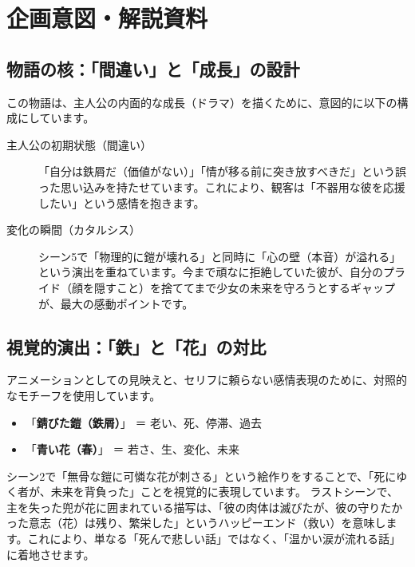 \clearpage\section{企画意図・解説資料}
\subsection{物語の核：「間違い」と「成長」の設計}
この物語は、主人公の内面的な成長（ドラマ）を描くために、意図的に以下の構成にしています。
\begin{description}
    \item [主人公の初期状態（間違い）] 「自分は鉄屑だ（価値がない）」「情が移る前に突き放すべきだ」という誤った思い込みを持たせています。これにより、観客は「不器用な彼を応援したい」という感情を抱きます。
    \item [変化の瞬間（カタルシス）] シーン5で「物理的に鎧が壊れる」と同時に「心の壁（本音）が溢れる」という演出を重ねています。今まで頑なに拒絶していた彼が、自分のプライド（顔を隠すこと）を捨ててまで少女の未来を守ろうとするギャップが、最大の感動ポイントです。
\end{description}

\subsection{視覚的演出：「鉄」と「花」の対比}
アニメーションとしての見映えと、セリフに頼らない感情表現のために、対照的なモチーフを使用しています。
\begin{itemize}
    \item 「\textbf{錆びた鎧（鉄屑）}」 ＝ 老い、死、停滞、過去
    \item 「\textbf{青い花（春）}」 ＝ 若さ、生、変化、未来
\end{itemize}
シーン2で「無骨な鎧に可憐な花が刺さる」という絵作りをすることで、「死にゆく者が、未来を背負った」ことを視覚的に表現しています。
ラストシーンで、主を失った兜が花に囲まれている描写は、「彼の肉体は滅びたが、彼の守りたかった意志（花）は残り、繁栄した」というハッピーエンド（救い）を意味します。これにより、単なる「死んで悲しい話」ではなく、「温かい涙が流れる話」に着地させます。

